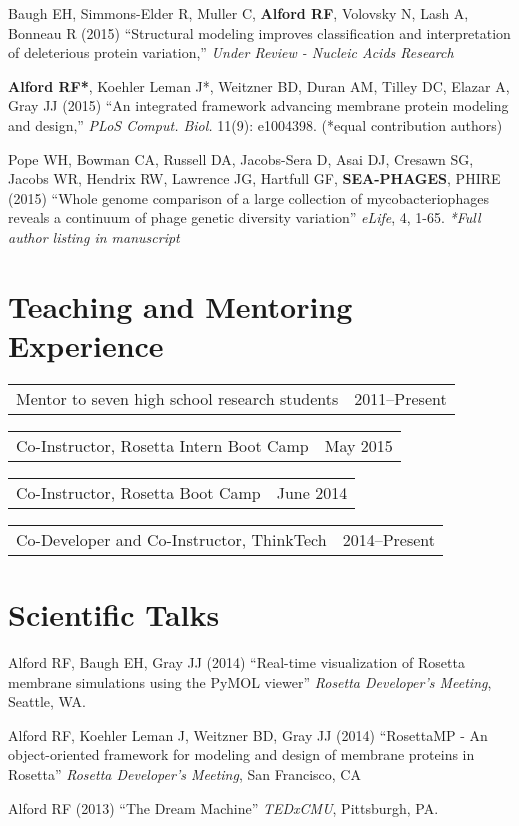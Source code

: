 \documentclass[11pt]{article}
\makeatletter
\newcommand{\allcapsspacing}[1]{{\addfontfeature{LetterSpace=7.5}#1}}
\newcommand{\yearitem}[2]{
\noindent
\begin{tabular*}{\textwidth}{@{\extracolsep{\fill}}lr}
		#1 & #2 \\
\end{tabular*}\vspace{0.5\baselineskip}}
\makeatother
\begin{document}
\begin{etaremune}
\item Baugh EH, Simmons-Elder R, Muller C, \textbf{Alford RF}, Volovsky N, Lash A, Bonneau R (2015) ``Structural modeling improves classification and interpretation of deleterious protein variation,'' \textit{Under Review - Nucleic Acids Research}

\item \textbf{Alford RF*}, Koehler Leman J*, Weitzner BD, Duran AM, Tilley DC, Elazar A, Gray JJ (2015) ``An integrated framework advancing membrane protein modeling and design,'' \textit{PLoS Comput. Biol.} 11(9): e1004398. (*equal contribution authors)

\item Pope WH, Bowman CA, Russell DA, Jacobs-Sera D, Asai DJ, Cresawn SG, Jacobs WR, Hendrix RW, Lawrence JG, Hartfull GF, \textbf{SEA-PHAGES}, PHIRE (2015) ``Whole genome comparison of a large collection of mycobacteriophages reveals a continuum of phage genetic diversity variation'' \textit{eLife}, 4, 1-65. \textit{*Full author listing in manuscript}
\end{etaremune}

\section*{\allcapsspacing{Teaching and Mentoring Experience}}

\yearitem{Mentor to seven high school research students}{2011--Present}
\yearitem{Co-Instructor, Rosetta Intern Boot Camp}{May 2015}
\yearitem{Co-Instructor, Rosetta Boot Camp}{June 2014}
\yearitem{Co-Developer and Co-Instructor, ThinkTech}{2014--Present}

\section*{\allcapsspacing{Scientific Talks}}

\begin{etaremune}
\item Alford RF, Baugh EH, Gray JJ (2014) ``Real-time visualization of Rosetta membrane simulations using the PyMOL viewer'' \textit{Rosetta Developer's Meeting}, Seattle, WA.
\item Alford RF, Koehler Leman J, Weitzner BD, Gray JJ (2014) ``RosettaMP - An object-oriented framework for modeling and design of membrane proteins in Rosetta'' \textit{Rosetta Developer's Meeting}, San Francisco, CA
\item Alford RF (2013) ``The Dream Machine'' \textit{TEDxCMU}, Pittsburgh, PA.
\end{etaremune}
\end{document}

